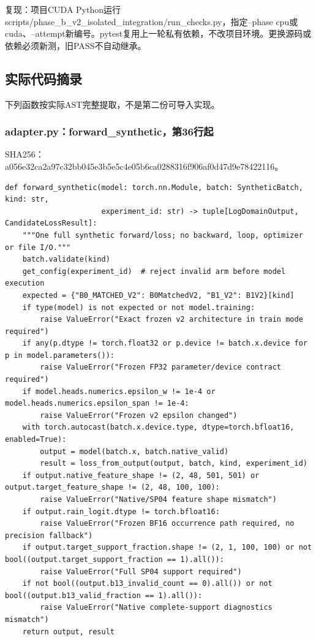 \documentclass[UTF8,fontset=fandol,10pt]{ctexart}
\begin{document}
复现：项目CUDA Python运行scripts/\allowbreak{}phase\_\allowbreak{}b\_\allowbreak{}v2\_\allowbreak{}isolated\_\allowbreak{}integration/\allowbreak{}run\_\allowbreak{}checks.py，指定--phase cpu或cuda、--attempt新编号。pytest复用上一轮私有依赖，不改项目环境。更换源码或依赖必须新测，旧PASS不自动继承。

\subsection{实际代码摘录}

下列函数按实际AST完整提取，不是第二份可导入实现。

\subsubsection{adapter.py：forward\_\allowbreak{}synthetic，第36行起}

SHA256：a056e32ca2a9\allowbreak{}7c32bb045e3b\allowbreak{}5e5c4e05b6ca\allowbreak{}0288316f906a\allowbreak{}f0d47d9e7842\allowbreak{}2116。

\begin{lstlisting}
def forward_synthetic(model: torch.nn.Module, batch: SyntheticBatch, kind: str,
                      experiment_id: str) -> tuple[LogDomainOutput, CandidateLossResult]:
    """One full synthetic forward/loss; no backward, loop, optimizer or file I/O."""
    batch.validate(kind)
    get_config(experiment_id)  # reject invalid arm before model execution
    expected = {"B0_MATCHED_V2": B0MatchedV2, "B1_V2": B1V2}[kind]
    if type(model) is not expected or not model.training:
        raise ValueError("Exact frozen v2 architecture in train mode required")
    if any(p.dtype != torch.float32 or p.device != batch.x.device for p in model.parameters()):
        raise ValueError("Frozen FP32 parameter/device contract required")
    if model.heads.numerics.epsilon_w != 1e-4 or model.heads.numerics.epsilon_span != 1e-4:
        raise ValueError("Frozen v2 epsilon changed")
    with torch.autocast(batch.x.device.type, dtype=torch.bfloat16, enabled=True):
        output = model(batch.x, batch.native_valid)
        result = loss_from_output(output, batch, kind, experiment_id)
    if output.native_feature_shape != (2, 48, 501, 501) or output.target_feature_shape != (2, 48, 100, 100):
        raise ValueError("Native/SP04 feature shape mismatch")
    if output.rain_logit.dtype != torch.bfloat16:
        raise ValueError("Frozen BF16 occurrence path required, no precision fallback")
    if output.target_support_fraction.shape != (2, 1, 100, 100) or not bool((output.target_support_fraction == 1).all()):
        raise ValueError("Full SP04 support required")
    if not bool((output.b13_invalid_count == 0).all()) or not bool((output.b13_valid_fraction == 1).all()):
        raise ValueError("Native complete-support diagnostics mismatch")
    return output, result
\end{lstlisting}
\end{document}
